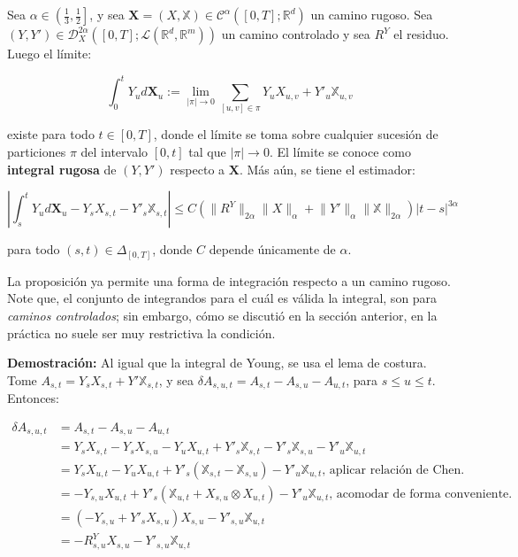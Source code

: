 \begin{prop}
	Sea $\alpha \in \left( \frac{1}{3}, \frac{1}{2} \right]$, y sea $\mathbf{X} = (X, \mathbb{X}) \in \mathscr{C}^{\alpha} ([0,T]; \mathbb{R}^d)$ un camino rugoso. Sea $(Y, Y') \in \mathscr{D}^{2\alpha}_X ([0,T]; \mathcal{L}( \mathbb{R}^d, \mathbb{R}^m  ))$ un camino controlado y sea $R^Y$ el residuo. Luego el límite:

	\[
		\int_0^t Y_u d\mathbf{X}_u := \lim_{ \lvert \pi \rvert \rightarrow 0 } \sum_{ [u,v] \in \pi } Y_u X_{u,v} + Y'_u \mathbb{X}_{u,v}	
	\]

	existe para todo $t \in [0,T]$, donde el límite se toma sobre cualquier sucesión de particiones $\pi$ del intervalo $[0,t]$ tal que $\lvert \pi \rvert \rightarrow 0$. El límite se conoce como \textbf{integral rugosa} de $(Y, Y')$ respecto a $\mathbf{X}$. Más aún, se tiene el estimador:

	\[
		\left\lvert \int_s^t Y_u d \mathbf{X}_u - Y_s X_{s,t} - Y'_s \mathbb{X}_{s,t} \right\rvert \leq C \left(  \lVert R^Y \rVert_{2\alpha} \lVert X \rVert_{\alpha} + \lVert Y' \rVert_{\alpha} \lVert \mathbb{X} \rVert_{2\alpha} \right) \lvert t - s \rvert^{3 \alpha}
	\]

	para todo $(s,t) \in \Delta_{[0,T]}$, donde $C$ depende únicamente de $\alpha$.

\end{prop}

La proposición ya permite una forma de integración respecto a un camino rugoso. Note que, el conjunto de integrandos para el cuál es válida la integral, son para \textit{caminos controlados}; sin embargo, cómo se discutió en la sección anterior, en la práctica no suele ser muy restrictiva la condición.

\textbf{Demostración:} Al igual que la integral de Young, se usa el lema de costura. Tome $A_{s,t} = Y_s X_{s,t} + Y' \mathbb{X}_{s,t}$, y sea $\delta A_{s,u,t} = A_{s,t} - A_{s,u} - A_{u,t}$, para $s \leq u \leq t$. Entonces:

\begin{align*}
	\delta A_{s,u,t} &= A_{s,t} - A_{s,u} - A_{u,t} \\
	&= Y_s X_{s,t} - Y_s X_{s,u} - Y_u X_{u,t} + Y'_s \mathbb{X}_{s,t} - Y'_s \mathbb{X}_{s,u} - Y'_u \mathbb{X}_{u,t} \\
	&= Y_s X_{u,t} - Y_u X_{u,t} + Y'_s ( \mathbb{X}_{s,t} - \mathbb{X}_{s,u} ) - Y'_u \mathbb{X}_{u,t} \text{, aplicar relación de Chen.}\\
	&= - Y_{s,u} X_{u,t} + Y'_s (\mathbb{X}_{u,t} + X_{s,u} \otimes X_{u,t}) - Y'_u \mathbb{X}_{u,t} \text{, acomodar de forma conveniente.} \\
	&= (-Y_{s,u} + Y'_s X_{s,u}) X_{s,u} - Y'_{s,u} \mathbb{X}_{u,t} \\
	&= -R^Y_{s,u} X_{s,u} - Y'_{s,u} \mathbb{X}_{u,t}
\end{align*}

